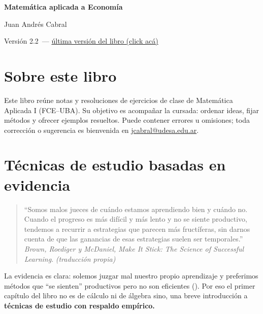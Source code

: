 \documentclass{article}
\renewcommand{\contentsname}{Contenido}%
\newcommand{\version}{2.2}
\begin{document}
\begin{titlepage}
    \centering
    \vspace*{2cm}
    {\Huge\bfseries\color{teal} Matemática aplicada a Economía\par}
    \vspace{0.5cm}
    {\Large\bfseries \par}
    \vspace{2cm}
    {\large Juan Andrés Cabral\par}
    \vfill
{\normalsize Versión \version\ — \href{https://cabraljuan.github.io/matematica%20aplicada/matematica%20aplicada%201.pdf}{última versión del libro (click acá)}\par}
    \thispagestyle{empty}
\end{titlepage}




\section*{Sobre este libro}

Este libro reúne notas y resoluciones de ejercicios de clase de Matemática Aplicada I (FCE–UBA). Su objetivo es acompañar la cursada: ordenar ideas, fijar métodos y ofrecer ejemplos resueltos. Puede contener errores u omisiones; toda corrección o sugerencia es bienvenida en \url{jcabral@udesa.edu.ar}.
\newpage




\renewcommand{\contentsname}{Índice}
\tableofcontents
\newpage






\section{Técnicas de estudio basadas en evidencia}


\begin{quote}
``Somos malos jueces de cuándo estamos aprendiendo bien y cuándo no. Cuando el progreso es más difícil y más lento y no se siente productivo, tendemos a recurrir a estrategias que parecen más fructíferas, sin darnos cuenta de que las ganancias de esas estrategias suelen ser temporales.''\\
\emph{Brown, Roediger y McDaniel,} \textit{Make It Stick: The Science of Successful Learning}. \textit{(traducción propia)}
\end{quote}

La evidencia es clara: solemos juzgar mal nuestro propio aprendizaje y preferimos métodos que “se sienten” productivos pero no son eficientes (\cite{Brown2014MakeItStick}). Por eso el primer capítulo del libro no es de cálculo ni de álgebra sino, una breve introducción a \textbf{\color{teal}técnicas de estudio con respaldo empírico.}
\end{document}
